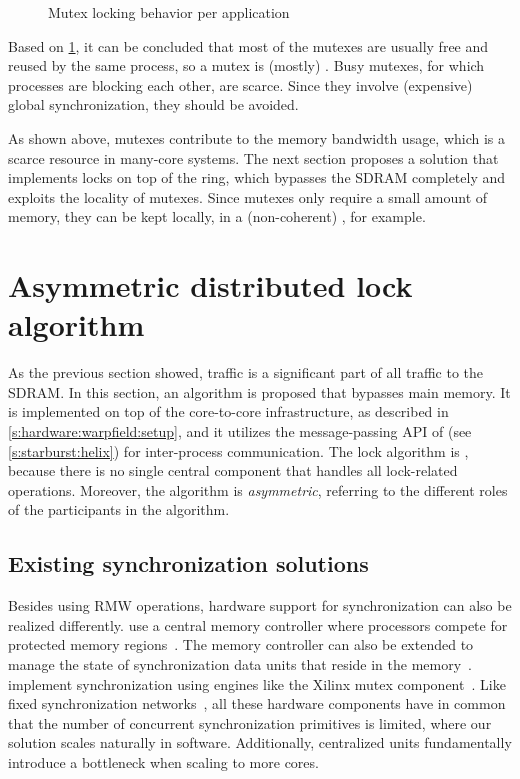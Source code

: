 \begin{figure}%
%
\caption{Mutex locking behavior per application}%
\label{fig:hardware:lockstats}%
\end{figure}

Based on \cref{fig:hardware:lockstats}, it can be concluded that most of the mutexes are usually free and reused by the same process, so a mutex is (mostly) \emph{}.
Busy mutexes, for which processes are blocking each other, are scarce.
Since they involve (expensive) global synchronization, they should be avoided.

As shown above, mutexes contribute to the memory bandwidth usage, which is a scarce resource in many-core systems.
The next section proposes a solution that implements locks on top of the ring, which bypasses the \ac{SDRAM} completely and exploits the locality of mutexes.
Since mutexes only require a small amount of memory, they can be kept locally, in a (non-coherent) , for example.


\section{Asymmetric distributed lock algorithm}
\label{s:hardware:distlock}

As the previous section showed,  traffic is a significant part of all traffic to the \ac{SDRAM}.
In this section, an algorithm is proposed that bypasses main memory.
It is implemented on top of the core-to-core  infrastructure, as described in \cref{s:hardware:warpfield:setup}, and it utilizes the message-passing \ac{API} of \Helix* (see \cref{s:starburst:helix}) for inter-process communication.
The lock algorithm is \emph{}, because there is no single central component that handles all lock-related operations.
Moreover, the algorithm is \emph{asymmetric}, referring to the different roles of the participants in the algorithm.

\subsection{Existing synchronization solutions}

Besides using \ac{RMW} operations, hardware support for synchronization can also be realized differently.
\citeauthor{stoif:hardware_sync} use a central memory controller where processors compete for protected memory regions~\cite{stoif:hardware_sync}.
The memory controller can also be extended to manage the state of synchronization data units that reside in the memory~\cite{monchiero:optim_for_sync,zhu:ssb}.
\citeauthor{tumeo:hwsw_sync} implement synchronization using engines like the Xilinx mutex component~\cite{tumeo:hwsw_sync}.
Like fixed synchronization networks~\cite{abellan:gline}, all these hardware components have in common that the number of concurrent synchronization primitives is limited, where our solution scales naturally in software.
Additionally, centralized units fundamentally introduce a bottleneck when scaling to more cores.


